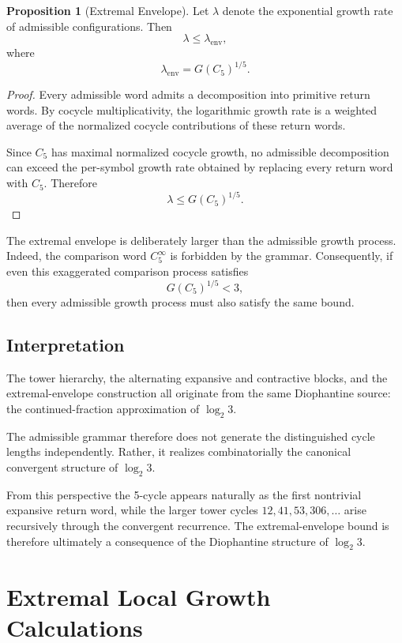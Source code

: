 \documentclass[12pt, oneside]{article}
\numberwithin{equation}{section}
\theoremstyle{definition}
\newtheorem{proposition}{Proposition}[section]
\theoremstyle{plain}
\theoremstyle{remark}
\begin{document}
\begin{proposition}[Extremal Envelope]
Let $\lambda$ denote the exponential growth rate of admissible
configurations. Then
\[
\lambda
\le
\lambda_{\mathrm{env}},
\]
where
\[
\lambda_{\mathrm{env}}
=
G(C_5)^{1/5}.
\]
\end{proposition}

\begin{proof}
Every admissible word admits a decomposition into primitive return words.
By cocycle multiplicativity, the logarithmic growth rate is a weighted
average of the normalized cocycle contributions of these return words.

Since $C_5$ has maximal normalized cocycle growth, no admissible
decomposition can exceed the per-symbol growth rate obtained by replacing
every return word with $C_5$. Therefore
\[
\lambda
\le
G(C_5)^{1/5}.
\]
\end{proof}

The extremal envelope is deliberately larger than the admissible growth
process. Indeed, the comparison word $C_5^\infty$ is forbidden by the
grammar. Consequently, if even this exaggerated comparison process
satisfies
\[
G(C_5)^{1/5}<3,
\]
then every admissible growth process must also satisfy the same bound.

\subsection{Interpretation}

The tower hierarchy, the alternating expansive and contractive blocks,
and the extremal-envelope construction all originate from the same
Diophantine source: the continued-fraction approximation of
\(\log_2 3\).

The admissible grammar therefore does not generate the distinguished
cycle lengths independently. Rather, it realizes combinatorially the
canonical convergent structure of \(\log_2 3\).

From this perspective the 5-cycle appears naturally as the first
nontrivial expansive return word, while the larger tower cycles
\(12,41,53,306,\ldots\) arise recursively through the convergent
recurrence. The extremal-envelope bound is therefore ultimately a
consequence of the Diophantine structure of \(\log_2 3\).

\newpage
\section{Extremal Local Growth Calculations}
\label{app:local-growth-details}
\end{document}

